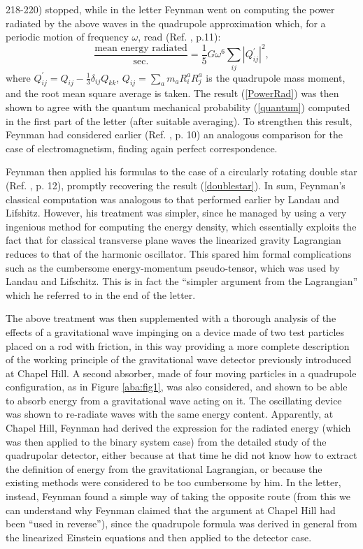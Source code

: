 \documentclass{ws-procs961x669}            %
\begin{document}
218-220) stopped, while in the letter Feynman went on computing
the power radiated by the above waves in the quadrupole
approximation which, for a periodic motion of frequency $\omega$,
read (Ref. , p.11):
%
\begin{equation}\label{PowerRad}
\frac{\text{mean energy radiated}}{\text{sec.}}=\frac{1}{5} G
\omega^6 \sum_{ij} \left| Q_{ij}^{'} \right|^2,
\end{equation}
%
where $Q_{ij}^{'}=Q_{ij}-\frac{1}{3} \delta_{ij} Q_{kk}$,
$Q_{ij}=\sum_{a} m_a R_i^a R_j^a$ is the quadrupole mass moment,
and the root mean square average is taken. The result
(\ref{PowerRad}) was then shown to agree with the quantum
mechanical probability (\ref{quantum}) computed in the first part
of the letter (after suitable averaging). To strengthen this
result, Feynman had considered earlier (Ref.
, p. 10) an analogous comparison for the
case of electromagnetism, finding again perfect correspondence.


Feynman then applied his formulas to the case of a circularly
rotating double star (Ref. , p. 12),
promptly recovering the result (\ref{doublestar}). In sum,
Feynman's classical computation was analogous to that performed
earlier by Landau and Lifshitz. However, his treatment was
simpler, since he managed by using a very ingenious method for
computing the energy density, which essentially exploits the fact
that for classical transverse plane waves the linearized gravity
Lagrangian reduces to that of the harmonic oscillator. This spared
him formal complications such as the cumbersome energy-momentum
pseudo-tensor, which was used by Landau and Lifschitz. This is in
fact the ``simpler argument from the Lagrangian'' which he
referred to in the end of the letter.

The above treatment was then supplemented with a thorough analysis
of the effects of a gravitational wave impinging on a device made
of two test particles placed on a rod with friction, in this way
providing a more complete description of the working principle of
the gravitational wave detector previously introduced at Chapel
Hill. A second absorber, made of four moving particles in a
quadrupole configuration, as in Figure \ref{aba:fig1}, was also
considered, and shown to be able to absorb energy from a
gravitational wave acting on it. The oscillating device was shown
to re-radiate waves with the same energy content. Apparently, at
Chapel Hill, Feynman had derived the expression for the radiated
energy (which was then applied to the binary system case) from the
detailed study of the quadrupolar detector, either because at that
time he did not know how to extract the definition of energy from
the gravitational Lagrangian, or because the existing methods were
considered to be too cumbersome by him. In the letter, instead,
Feynman found a simple way of taking the opposite route (from this
we can understand why Feynman claimed that the argument at Chapel
Hill had been ``used in reverse''), since the quadrupole formula
was derived in general from the linearized Einstein equations and
then applied to the detector case.
\end{document}

